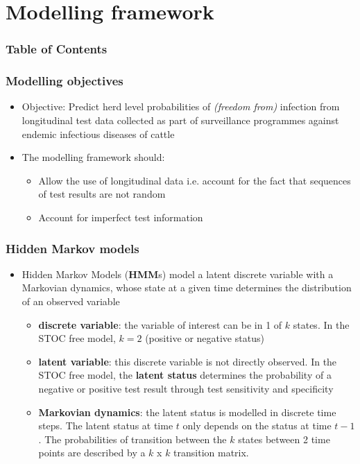\documentclass{beamer}
\begin{document}
\section{Modelling framework}
\begin{frame}
\frametitle{Table of Contents}
  \tableofcontents[currentsection]
\end{frame} 

\begin{frame}
\frametitle{Modelling objectives}
\begin{itemize}
 \item{Objective: Predict herd level probabilities of \emph{(freedom from)} infection from longitudinal test data collected as part of surveillance programmes against endemic infectious diseases of cattle}
 \item{The modelling framework should:}
 \begin{itemize}
  \item{Allow the use of longitudinal data i.e. account for the fact that sequences of test results are not random}
  \item{Account for imperfect test information}
 \end{itemize}
\end{itemize}
\end{frame}

\begin{frame}
\frametitle{Hidden Markov models}
\begin{itemize}
 \item{Hidden Markov Models (\textbf{HMM}s) model a latent discrete variable with a Markovian dynamics, whose state at a given time determines the distribution of an observed variable}
  \begin{itemize}
   \item{\textbf{discrete variable}: the variable of interest can be in 1 of $k$ states. In the STOC free model, $k=2$ (positive or negative status)}
   \item{\textbf{latent variable}: this discrete variable is not directly observed. In the STOC free model, the \textbf{latent status} determines the probability of a negative or positive test result through test sensitivity and specificity}
   \item{\textbf{Markovian dynamics}: the latent status is modelled in discrete time steps. The latent status at time $t$ only depends on the status at time $t-1$. The probabilities of transition between the $k$ states between 2 time points are described by a $k$ x $k$ transition matrix.}
  \end{itemize}
\end{itemize}
\end{frame}
\end{document}
